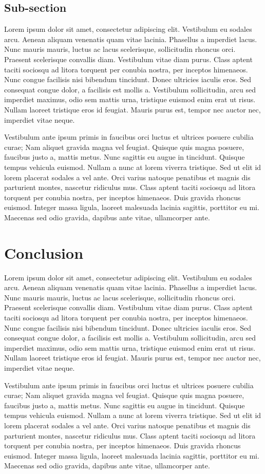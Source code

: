 \documentclass{proc}
\begin{document}
\subsection{Sub-section}
Lorem ipsum dolor sit amet, consectetur adipiscing elit. Vestibulum eu sodales arcu. Aenean aliquam venenatis quam vitae lacinia. Phasellus a imperdiet lacus. Nunc mauris mauris, luctus ac lacus scelerisque, sollicitudin rhoncus orci. Praesent scelerisque convallis diam. Vestibulum vitae diam purus. Class aptent taciti sociosqu ad litora torquent per conubia nostra, per inceptos himenaeos. Nunc congue facilisis nisi bibendum tincidunt. Donec ultricies iaculis eros. Sed consequat congue dolor, a facilisis est mollis a. Vestibulum sollicitudin, arcu sed imperdiet maximus, odio sem mattis urna, tristique euismod enim erat ut risus. Nullam laoreet tristique eros id feugiat. Mauris purus est, tempor nec auctor nec, imperdiet vitae neque.

Vestibulum ante ipsum primis in faucibus orci luctus et ultrices posuere cubilia curae; Nam aliquet gravida magna vel feugiat. Quisque quis magna posuere, faucibus justo a, mattis metus. Nunc sagittis eu augue in tincidunt. Quisque tempus vehicula euismod. Nullam a nunc at lorem viverra tristique. Sed ut elit id lorem placerat sodales a vel ante. Orci varius natoque penatibus et magnis dis parturient montes, nascetur ridiculus mus. Class aptent taciti sociosqu ad litora torquent per conubia nostra, per inceptos himenaeos. Duis gravida rhoncus euismod. Integer massa ligula, laoreet malesuada lacinia sagittis, porttitor eu mi. Maecenas sed odio gravida, dapibus ante vitae, ullamcorper ante.

\section{Conclusion}
Lorem ipsum dolor sit amet, consectetur adipiscing elit. Vestibulum eu sodales arcu. Aenean aliquam venenatis quam vitae lacinia. Phasellus a imperdiet lacus. Nunc mauris mauris, luctus ac lacus scelerisque, sollicitudin rhoncus orci. Praesent scelerisque convallis diam. Vestibulum vitae diam purus. Class aptent taciti sociosqu ad litora torquent per conubia nostra, per inceptos himenaeos. Nunc congue facilisis nisi bibendum tincidunt. Donec ultricies iaculis eros. Sed consequat congue dolor, a facilisis est mollis a. Vestibulum sollicitudin, arcu sed imperdiet maximus, odio sem mattis urna, tristique euismod enim erat ut risus. Nullam laoreet tristique eros id feugiat. Mauris purus est, tempor nec auctor nec, imperdiet vitae neque.

Vestibulum ante ipsum primis in faucibus orci luctus et ultrices posuere cubilia curae; Nam aliquet gravida magna vel feugiat. Quisque quis magna posuere, faucibus justo a, mattis metus. Nunc sagittis eu augue in tincidunt. Quisque tempus vehicula euismod. Nullam a nunc at lorem viverra tristique. Sed ut elit id lorem placerat sodales a vel ante. Orci varius natoque penatibus et magnis dis parturient montes, nascetur ridiculus mus. Class aptent taciti sociosqu ad litora torquent per conubia nostra, per inceptos himenaeos. Duis gravida rhoncus euismod. Integer massa ligula, laoreet malesuada lacinia sagittis, porttitor eu mi. Maecenas sed odio gravida, dapibus ante vitae, ullamcorper ante.
\end{document}

